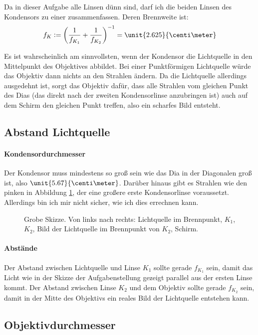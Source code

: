\documentclass[11pt, ngerman, fleqn]{article}
\begin{document}
Da in dieser Aufgabe alle Linsen dünn sind, darf ich die beiden Linsen des
Kondensors zu einer zusammenfassen. Deren Brennweite ist:
\[
	f_K := \del{\frac 1{f_{K_1}} + \frac 1{f_{K_2}}}^{-1}
	= \unit{2.625}{\centi\meter}
\]

Es ist wahrscheinlich am sinnvollsten, wenn der Kondensor die Lichtquelle in
den Mittelpunkt des Objektives abbildet. Bei einer Punktförmigen Lichtquelle
würde das Objektiv dann nichts an den Strahlen ändern. Da die Lichtquelle
allerdings ausgedehnt ist, sorgt das Objektiv dafür, dass alle Strahlen vom
gleichen Punkt des Dias (das direkt nach der zweiten Kondensorlinse anzubringen
ist) auch auf dem Schirm den gleichen Punkt treffen, also ein scharfes Bild
entsteht.

\subsection{Abstand Lichtquelle}

\paragraph{Kondensordurchmesser}

Der Kondensor muss mindestens so groß sein wie das Dia in der Diagonalen groß
ist, also $\unit{5.67}{\centi\meter}$. Darüber hinaus gibt es Strahlen wie den
pinken in Abbildung \ref{241}, der eine großere erste Kondensorlinse
voraussetzt. Allerdings bin ich mir nicht sicher, wie ich dies errechnen kann.

\begin{figure}
	\centering
	\caption{%
	Grobe Skizze. Von links nach rechts: Lichtquelle im Brennpunkt, $K_1$,
	$K_2$, Bild der Lichtquelle im Brennpunkt von $K_2$, Schirm.
	}
	\label{241}
\end{figure}

\paragraph{Abstände}

Der Abstand zwischen Lichtquelle und Linse $K_1$ sollte gerade $f_{K_1}$ sein,
damit das Licht wie in der Skizze der Aufgabenstellung gezeigt parallel aus der
ersten Linse kommt. Der Abstand zwischen Linse $K_2$ und dem Objektiv sollte
gerade $f_{K_2}$ sein, damit in der Mitte des Objektivs ein reales Bild der
Lichtquelle entstehen kann.

\subsection{Objektivdurchmesser}
\end{document}
